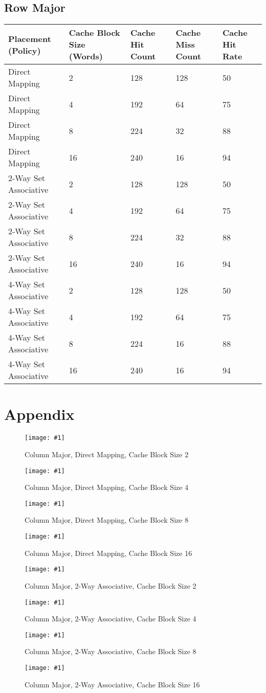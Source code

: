 \documentclass[11pt,a4paper]{article}
\newcommand{\cacheResultFigure}[3]{
\begin{figure}
	\centering
	\texttt{[image: \#1]}
	\caption{#2}
	\label{#3}
\end{figure}
}
\begin{document}
\subsection{Row Major}
\begin{tabular}{lllll}
\hline %
Placement (Policy) & Cache Block Size (Words) & Cache Hit Count & Cache Miss Count & Cache Hit Rate \\
\hline %
Direct Mapping & 2 & 128 & 128 & 50  \\
Direct Mapping & 4 & 192 & 64 & 75  \\
Direct Mapping & 8 & 224 & 32 & 88  \\
Direct Mapping & 16 & 240 & 16 & 94  \\
2-Way Set Associative & 2 & 128 & 128 & 50 \\
2-Way Set Associative & 4 & 192 & 64 & 75 \\
2-Way Set Associative & 8 & 224 & 32 & 88 \\
2-Way Set Associative & 16 & 240 & 16 & 94 \\
4-Way Set Associative & 2 & 128 & 128 & 50 \\
4-Way Set Associative & 4 & 192 & 64 & 75 \\
4-Way Set Associative & 8 & 224 & 16 & 88 \\
4-Way Set Associative & 16 & 240 & 16 & 94 \\
\hline %
\end{tabular} 




\newpage
\section{Appendix}
\cacheResultFigure{pictures/task4_columnMajor_directMapping2}{Column Major, Direct Mapping, Cache Block Size 2}{fig:pic}
\cacheResultFigure{pictures/task4_columnMajor_directMapping4}{Column Major, Direct Mapping, Cache Block Size 4}{fig:pic}
\cacheResultFigure{pictures/task4_columnMajor_directMapping8}{Column Major, Direct Mapping, Cache Block Size 8}{fig:pic}
\cacheResultFigure{pictures/task4_columnMajor_directMapping16}{Column Major, Direct Mapping, Cache Block Size 16}{fig:pic}

\cacheResultFigure{pictures/task4_columnMajor_2waySetAssociative2}{Column Major, 2-Way Associative, Cache Block Size 2}{fig:pic}
\cacheResultFigure{pictures/task4_columnMajor_2waySetAssociative4}{Column Major, 2-Way Associative, Cache Block Size 4}{fig:pic}
\cacheResultFigure{pictures/task4_columnMajor_2waySetAssociative8}{Column Major, 2-Way Associative, Cache Block Size 8}{fig:pic}
\cacheResultFigure{pictures/task4_columnMajor_2waySetAssociative16}{Column Major, 2-Way Associative, Cache Block Size 16}{fig:pic}
\end{document}
